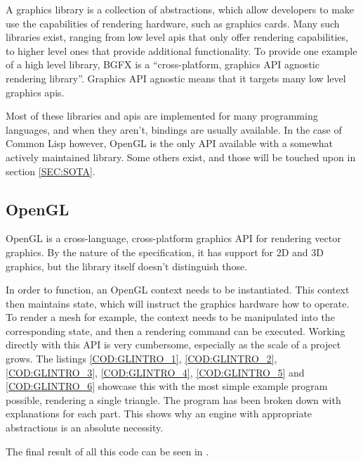 
A graphics library is a collection of abstractions,
which allow developers to make use the capabilities of rendering hardware,
such as graphics cards.
Many such libraries exist,
ranging from low level \ac{api}s that only offer rendering capabilities,
to higher level ones that provide additional functionality.
To provide one example of a high level library,
BGFX\cite{bgfx} is a ``cross-platform, graphics API agnostic rendering library''.
Graphics API agnostic means that it targets many low level graphics \ac{api}s.

Most of these libraries and \ac{api}s are implemented for many programming languages,
and when they aren't,
bindings are usually available.
In the case of Common Lisp however,
OpenGL is the only API available with a somewhat actively maintained library.
Some others exist,
and those will be touched upon in section \ref{SEC:SOTA}.

\subsection{OpenGL}


OpenGL\cite{khronos} is a cross-language,
cross-platform graphics API for rendering vector graphics.
By the nature of the specification,
it has support for 2D and 3D graphics,
but the library itself doesn't distinguish those.

In order to function,
an OpenGL context needs to be instantiated.
This context then maintains state,
which will instruct the graphics hardware how to operate.
To render a mesh for example,
the context needs to be manipulated into the corresponding state,
and then a rendering command can be executed.
Working directly with this API is very cumbersome,
especially as the scale of a project grows.
The listings \ref{COD:GLINTRO_1},
\ref{COD:GLINTRO_2},
\ref{COD:GLINTRO_3},
\ref{COD:GLINTRO_4},
\ref{COD:GLINTRO_5} and \ref{COD:GLINTRO_6}
showcase this with the most simple example program possible,
rendering a single triangle.
The program has been broken down with explanations for each part.
This shows why an engine with appropriate abstractions is an absolute necessity.

The final result of all this code can be seen in .


